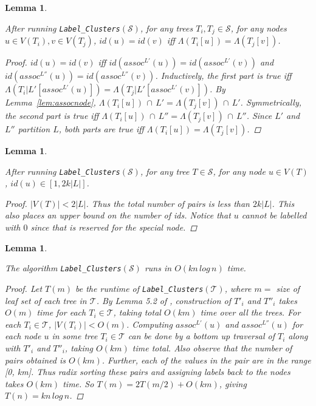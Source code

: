 \documentclass{article}
\newcommand{\leafset}{\Lambda}
\newtheorem{labelclusterscorrectness}[incompatibility]{Lemma}
\newtheorem{labelclustersidbounds}[incompatibility]{Lemma}
\newtheorem{labelclustersruntime}[incompatibility]{Lemma}
\begin{document}
    \medskip
    \begin{labelclusterscorrectness}
        \label{lem:labelclusterscorrectness}

        After running \texttt{Label\_Clusters}$(\mathcal{S})$, for any trees $T_i, T_j \in \mathcal{S}$, for any nodes $u \in V(T_i), v \in V(T_j)$, $id(u) = id(v)$ iff $\leafset(T_i[u]) = \leafset(T_j[v])$.

        \begin{proof}
            $id(u) = id(v)$ iff $id(assoc^{L'}(u)) = id(assoc^{L'}(v))$ and $id(assoc^{L''}(u)) = id(assoc^{L''}(v))$. Inductively, the first part is true iff $\leafset(T_i|L'[assoc^{L'}(u)]) = \leafset(T_j|L'[assoc^{L'}(v)])$. By Lemma~\ref{lem:assocnode}, $\leafset(T_i[u])\, \cap\, L' = \leafset(T_j[v])\, \cap\, L'$. Symmetrically, the second part is true iff $\leafset(T_i[u])\, \cap\, L'' = \leafset(T_j[v])\, \cap\, L''$. Since $L'$ and $L''$ partition $L$, both parts are true iff $\leafset(T_i[u]) = \leafset(T_j[v])$.
        \end{proof}
    \end{labelclusterscorrectness}

    \medskip
    \begin{labelclustersidbounds}
        \label{lem:labelclustersidbounds}

        After running \texttt{Label\_Clusters}$(\mathcal{S})$, for any tree $T \in \mathcal{S}$, for any node $u \in V(T)$, $id(u) \in [1, 2k |L|]$.

        \begin{proof}
            $|V(T)| < 2|L|$. Thus the total number of pairs is less than $2k|L|$. This also places an upper bound on the number of ids. Notice that $u$ cannot be labelled with $0$ since that is reserved for the special node.
        \end{proof}
    \end{labelclustersidbounds}

    \medskip
    \begin{labelclustersruntime}
        \label{lem:labelclustersruntime}

        The algorithm \texttt{Label\_Clusters}$(\mathcal{S})$ runs in $O(kn\,log\,n)$ time.

        \begin{proof}
            Let $T(m)$ be the runtime of \texttt{Label\_Clusters}$(\mathcal{T})$, where $m =$ size of leaf set of each tree in $\mathcal{T}$. By Lemma 5.2 of \cite{farach1995fast}, construction of $T'_i$ and $T''_i$ takes $O(m)$ time for each $T_i \in \mathcal{T}$, taking total $O(km)$ time over all the trees. For each $T_i \in \mathcal{T}$, $|V(T_i)| < O(m)$. Computing $assoc^{L'}(u)$ and $assoc^{L''}(u)$ for each node $u$ in some tree $T_i \in \mathcal{T}$ can be done by a bottom up traversal of $T_i$ along with $T'_i$ and $T''_i$, taking $O(km)$ time total. Also observe that the number of pairs obtained is $O(km)$. Further, each of the values in the pair are in the range [0, km]. Thus radix sorting these pairs and assigning labels back to the nodes takes $O(km)$ time. So $T(m) = 2T(m/2) + O(km)$, giving $T(n) = kn\,log\,n$.
        \end{proof}
    \end{labelclustersruntime}
\end{document}
